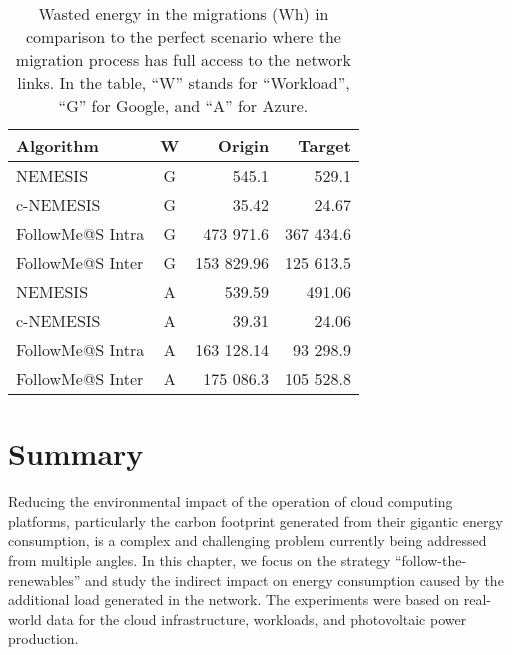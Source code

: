 \begin{table}[h]

\caption{Wasted energy in the migrations (Wh) in comparison to the perfect scenario where the migration process has full access to the network links. In the table, ``W'' stands for ``Workload'', ``G'' for Google, and ``A'' for Azure.}\label{tab:wasted_mig} \centering
\begin{tabular}{|l|c|r|r|}
  \hline
  \textbf{Algorithm} & \textbf{W}  & \textbf{Origin} & \textbf{Target}   \\
  \hline
  NEMESIS  & G & 545.1  & 529.1 \\
  \hline
  c-NEMESIS & G & 35.42  & 24.67 \\
  \hline
  FollowMe@S Intra & G & 473 971.6 & 367 434.6 \\
  \hline
  FollowMe@S Inter & G & 153 829.96  & 125 613.5  \\
  \hline
  NEMESIS  & A & 539.59  & 491.06 \\
  \hline
  c-NEMESIS & A &  39.31 & 24.06   \\
  \hline
  FollowMe@S Intra & A & 163 128.14  & 93 298.9  \\
  \hline
  FollowMe@S Inter & A & 175 086.3  & 105 528.8 \\
  \hline

\end{tabular}
\end{table}


\section{Summary} \label{sec:conclusion_smargreens}


Reducing the environmental impact of the operation of cloud computing platforms, particularly the carbon footprint generated from their gigantic energy consumption, is a complex and challenging problem currently being addressed from multiple angles. In this chapter, we focus on the strategy ``follow-the-renewables'' and study the indirect impact on energy consumption caused by the additional load generated in the network. The experiments were based on real-world data for the cloud infrastructure, workloads, and photovoltaic power production.

